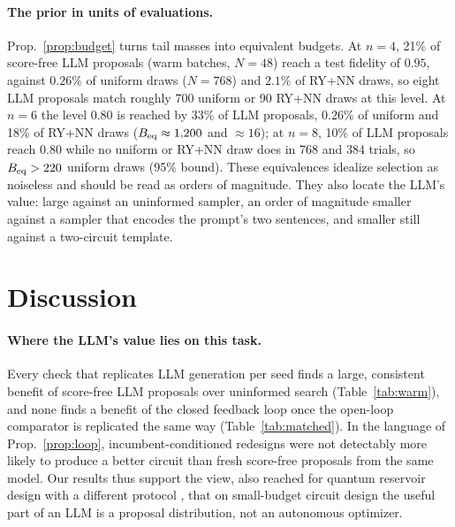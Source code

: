 \documentclass[11pt]{article}
\begin{document}
\paragraph{The prior in units of evaluations.}
Prop.~\ref{prop:budget} turns tail masses into equivalent budgets.
At $n=4$, 21\% of score-free LLM proposals (warm batches, $N=48$) reach a test fidelity
of $0.95$, against $0.26\%$ of uniform draws ($N=768$) and $2.1\%$ of RY+NN draws, so
eight LLM proposals match roughly 700 uniform or 90 RY+NN draws at this level.
At $n=6$ the level $0.80$ is reached by 33\% of LLM proposals, $0.26\%$ of uniform and
18\% of RY+NN draws ($B_{\rm eq}\approx1{,}200$ and $\approx16$); at $n=8$, 10\% of LLM
proposals reach $0.80$ while no uniform or RY+NN draw does in 768 and 384 trials, so
$B_{\rm eq}>220$ uniform draws (95\% bound).
These equivalences idealize selection as noiseless and should be read as orders of
magnitude. They also locate the LLM's value: large against an uninformed sampler, an
order of magnitude smaller against a sampler that encodes the prompt's two sentences,
and smaller still against a two-circuit template.

\section{Discussion}
\label{sec:discussion}

\paragraph{Where the LLM's value lies on this task.}
Every check that replicates LLM generation per seed finds a large, consistent benefit
of score-free LLM proposals over uninformed search (Table~\ref{tab:warm}), and none
finds a benefit of the closed feedback loop once the open-loop comparator is
replicated the same way (Table~\ref{tab:matched}). In the language of
Prop.~\ref{prop:loop}, incumbent-conditioned redesigns were not detectably more likely
to produce a better circuit than fresh score-free proposals from the same model.
Our results thus support the view, also reached for quantum reservoir design with a
different protocol \cite{bhatia2026qrc}, that on small-budget circuit design the useful
part of an LLM is a proposal distribution, not an autonomous optimizer.
\end{document}
